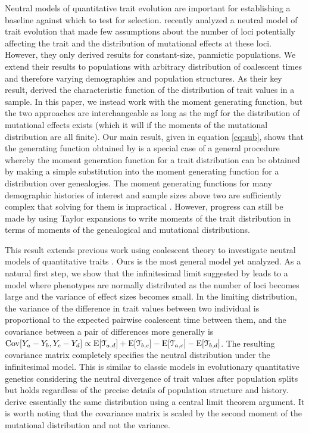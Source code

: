 Neutral models of quantitative trait evolution are important for establishing a
baseline against which to test for selection. \citet{Schraiber2015} recently
analyzed a neutral model of trait evolution that made few assumptions about the
number of loci potentially affecting the trait and the distribution of
mutational effects at these loci. However, they only derived results for
constant-size, panmictic populations. We extend their results to populations
with arbitrary distribution of coalescent times and therefore varying
demographies and population structures. As their key result,
\citet{Schraiber2015} derived the characteristic function of the distribution of
trait values in a sample. In this paper, we instead work with the moment
generating function, but the two approaches are interchangeable as long as the
mgf for the distribution of mutational effects exists (which it will if the
moments of the mutational distribution are all finite). Our main result, given
in equation \eqref{eq:sub}, shows that the generating function obtained
by \citet{Schraiber2015} is a special case of a general procedure whereby the
moment generation function for a trait distribution can be obtained by making a
simple substitution into the moment generating function for a distribution over
genealogies. The moment generating functions for many demographic histories of
interest and sample sizes above two are sufficiently complex that solving for
them is impractical
\citep{Lohse2011}. However, progress can still be made by using Taylor
expansions to write moments of the trait distribution in terms of moments of the
genealogical and mutational distributions.

This result extends previous work using coalescent theory to investigate neutral
models of quantitative traits \citep{Whitlock1999,Schraiber2015}. Ours is the
most general model yet analyzed. As a natural first step, we show that the
infinitesimal limit suggested by \citet{Fisher1918} leads to a model where
phenotypes are normally distributed as the number of loci becomes large and the
variance of effect sizes becomes small. In the limiting distribution, the
variance of the difference in trait values between two individual is
proportional to the expected pairwise coalescent time between them, and the
covariance between a pair of differences more generally is $\mathrm{Cov}[Y_a - Y_b,Y_c -
Y_d] \propto \mathrm{E}[\mathcal{T}_{a,d}] + \mathrm{E}[\mathcal{T}_{b,c}] -
\mathrm{E}[\mathcal{T}_{a,c}] - \mathrm{E}[\mathcal{T}_{b,d}]$. The resulting covariance matrix
completely specifies the neutral distribution under the infinitesimal model.
This is similar to classic models in evolutionary quantitative genetics
considering the neutral divergence of trait values after population splits
\citep{Lande1976,Lynch1989} but holds regardless of the precise details of
population structure and history. \citet{Schraiber2015} derive essentially the
same distribution using a central limit theorem argument. It is worth noting
that the covariance matrix is scaled by the second moment of the mutational
distribution and not the variance.

